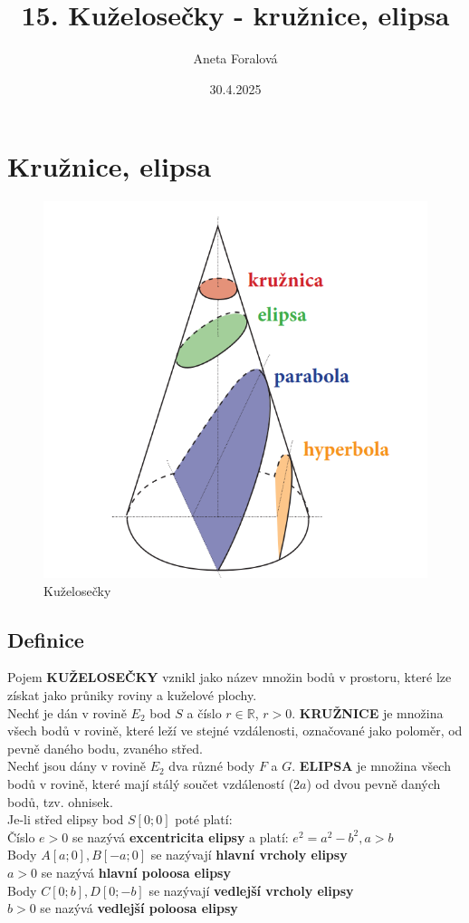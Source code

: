 \title{ 15. Kuželosečky - kružnice, elipsa}
\author{Aneta Foralová}
\date{30.4.2025}

\maketitle

\section{Kružnice, elipsa}


\begin{figure}[H]
        \centering
        \includegraphics[width=0.3\linewidth]{img/14_kuzelosecky.png}
        \caption{Kuželosečky} 
        \label{fig:enter-label}
    \end{figure}    

\subsection{Definice}
    Pojem \textbf{KUŽELOSEČKY} vznikl jako název množin bodů v prostoru, které lze získat jako průniky roviny a kuželové plochy.\\
    
    Nechť je dán v rovině $E_2$ bod $S$ a číslo $r \in \mathbb{R}$, $r > 0$. \textbf{KRUŽNICE} je množina všech bodů v rovině, které leží ve stejné vzdálenosti, označované jako poloměr, od pevně daného bodu, zvaného střed.\\
    
    Nechť jsou dány v rovině $E_2$ dva různé body $F$ a $G$. \textbf{ELIPSA} je množina všech bodů v rovině, které mají stálý součet vzdáleností ($2a$) od dvou pevně daných bodů, tzv. ohnisek.\\

    Je-li střed elipsy bod $S[0;0]$ poté platí:\\
    Číslo  $e > 0$ se nazývá \textbf{excentricita elipsy} a platí: $e^2 = a^2 - b^2 , a > b$\\
    Body $A[a;0], B[-a;0]$ se nazývají \textbf{hlavní vrcholy elipsy}\\ $a>0$ se nazývá \textbf{hlavní poloosa elipsy}\\ Body $C[0;b], D[0;-b]$ se nazývají \textbf{vedlejší vrcholy elipsy}\\$b>0$ se nazývá \textbf{vedlejší poloosa elipsy}\\
    


